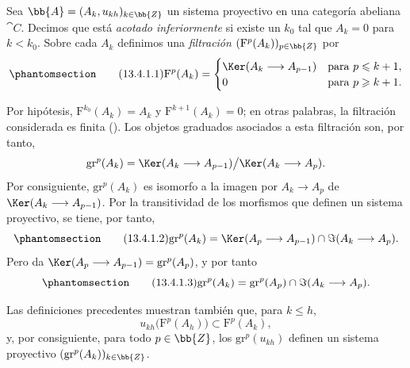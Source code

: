 \documentclass[oneside]{amsart}
\renewcommand{\leq}{\leqslant}
\renewcommand{\geq}{\geqslant}
\newcommand{\oldpage}[2][]{{\marginnote{\normalfont\textbf{#1}~|~#2}}\ignorespaces}
\let\EGAOriginalLabel\label
\renewcommand{\label}[1]{\phantomsection\EGAOriginalLabel{#1}}
\begin{document}
\begin{env}[13.4.1]
\label{0.13.4.1}
Sea
$\bb{A}=(A_k,u_{kh})_{k\in\bb{Z}}$ un sistema proyectivo en una
categoría abeliana $\cat{C}$.
Decimos que está \emph{acotado inferiormente} si existe un $k_0$ tal que
$A_k=0$ para $k<k_0$.
Sobre cada $A_k$ definimos una \emph{filtración}
$(\mathrm{F}^p(A_k))_{p\in\bb{Z}}$ por
\begin{equation}
\label{0.13.4.1.1}
\tag{13.4.1.1}
  \mathrm{F}^p(A_k)=
  \begin{cases}
    \Ker(A_k\longrightarrow A_{p-1}) & \text{para }p\leq k+1,\\
    0 & \text{para }p\geq k+1.
  \end{cases}
\end{equation}

\oldpage[0\textsubscript{III}]{70}
Por hipótesis,
$\mathrm{F}^{k_0}(A_k)=A_k$ y
$\mathrm{F}^{k+1}(A_k)=0$; en otras palabras, la filtración considerada
es finita ().
Los objetos graduados asociados a esta filtración son, por tanto,
\[
  \mathrm{gr}^p(A_k)
  =
  \Ker(A_k\longrightarrow A_{p-1})
  \big/
  \Ker(A_k\longrightarrow A_p).
\]
Por consiguiente, $\mathrm{gr}^p(A_k)$ es isomorfo a la imagen por
$A_k\longrightarrow A_p$ de
$\Ker(A_k\longrightarrow A_{p-1})$.
Por la transitividad de los morfismos que definen un sistema proyectivo,
se tiene, por tanto,
\begin{equation}
\label{0.13.4.1.2}
\tag{13.4.1.2}
  \mathrm{gr}^p(A_k)
  =
  \Ker(A_p\longrightarrow A_{p-1})
  \cap
  \Im(A_k\longrightarrow A_p).
\end{equation}
Pero  da
$\Ker(A_p\longrightarrow A_{p-1})=\mathrm{gr}^p(A_p)$, y por tanto
\begin{equation}
\label{0.13.4.1.3}
\tag{13.4.1.3}
  \mathrm{gr}^p(A_k)
  =
  \mathrm{gr}^p(A_p)
  \cap
  \Im(A_k\longrightarrow A_p).
\end{equation}

Las definiciones precedentes muestran también que, para $k\leq h$,
\[
  u_{kh}\bigl(\mathrm{F}^p(A_h)\bigr)
  \subset
  \mathrm{F}^p(A_k),
\]
y, por consiguiente, para todo $p\in\bb{Z}$, los
$\mathrm{gr}^p(u_{kh})$ definen un sistema proyectivo
$(\mathrm{gr}^p(A_k))_{k\in\bb{Z}}$.
\end{env}
\end{document}
